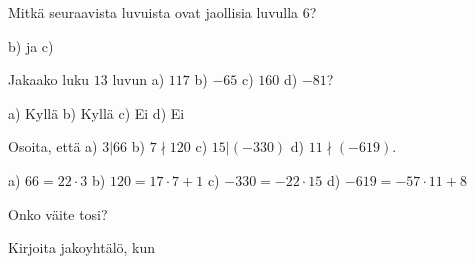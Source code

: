 \begin{tehtavasivu}

\begin{tehtava}
    Mitkä seuraavista luvuista ovat jaollisia luvulla $6$?
    \begin{vastaus}
        b) ja c)
    \end{vastaus}

\end{tehtava}

\begin{tehtava}
    Jakaako luku $13$ luvun a) $117$ b) $-65$ c) $160$ d) $-81$?
    \begin{vastaus}
        a) Kyllä b) Kyllä c) Ei d) Ei 
    \end{vastaus}
\end{tehtava}

\begin{tehtava}
    Osoita, että a) $3|66$ b) $7\nmid 120$ c) $15|(-330)$ d) $11\nmid (-619)$.
    \begin{vastaus}
        a) $66 = 22\cdot 3$ b) $120 = 17\cdot 7 + 1$ c) $-330 = -22\cdot 15$ d) $-619 = -57\cdot 11 + 8$ 
    \end{vastaus}

\end{tehtava}

\begin{tehtava}
    Onko väite tosi?
    
    \begin{vastaus}
    \end{vastaus}
\end{tehtava}

\begin{tehtava}
    Kirjoita jakoyhtälö, kun
    
    \begin{vastaus}
    \end{vastaus}
\end{tehtava}


\end{tehtavasivu}
